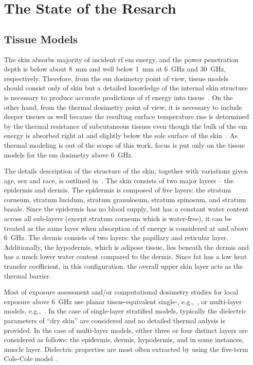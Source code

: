 \chapter{The State of the Resarch}
\label{chap:results}

\section{Tissue Models}
The skin absorbs majority of incident \gls{rf} \gls{em} energy, and the power penetration depth is below about \SI{8}{\mm} and well below \SI{1}{\mm} at \SI{6}{\GHz} and \SI{30}{\GHz}, respectively.
Therefore, from the \gls{em} dosimetry point of view, tissue models should consist only of skin but a detailed knowledge of the internal skin structure is necessary to produce accurate predictions of \gls{rf} energy into tissue~\cite{Ziskin2018Tissue}.
On the other hand, from the thermal dosimetry point of view, it is necessary to include deeper tissues as well because the resulting surface temperature rise is determined by the thermal resistance of subcutaneous tissues even though the bulk of the \gls{em} energy is absorbed right at and slightly below the sole surface of the skin~\cite{Ziskin2018Tissue}.
As thermal modeling is out of the scope of this work, focus is put only on the tissue models for the \gls{em} dosimetry above \SI{6}{\GHz}. 

The details description of the structure of the skin, together with variations given age, sex and race, is outlined in~\cite{Snyder1979Report}.
The skin consists of two major layers -- the epidermis and dermis.
The epidermis is composed of five layers: the stratum corneum, stratum lucidum, stratum granulosum, stratum spinosum, and stratum basale.
Since the epidermis has no blood supply, but has a constant water content across all sub-layers (except stratum corneum which is water-free), it can be treated as the same layer when absorption of \gls{rf} energy is considered at and above \SI{6}{\GHz}.
The dermis consists of two layers: the papillary and reticular layer.
Additionally, the hypodermis, which is adipose tissue, lies beneath the dermis and has a much lower water content compared to the dermis.
Since fat has a low heat transfer coefficient, in this configuration, the overall upper skin layer acts as the thermal barrier.

Most of exposure assessment and/or computational dosimetry studies for local exposure above \SI{6}{\GHz} use planar tissue-equivalent single-, e.g.,~\cite{Nakae2020Skin,Poljak2020Assessment,Ziane2020Antenna}, or multi-layer models, e.g.,~\cite{Wu2015Safe,Foster2018Modeling,He2018RF}.
In the case of single-layer stratified models, typically the dielectric parameters of ``dry skin'' are considered and no detailed thermal anlysis is provided.
In the case of multi-layer models, either three or four distinct layers are considered as follows: the epidermis, dermis, hypodermis, and in some instances, muscle layer.
Dielectric properties are most often extracted by using the five-term Cole-Cole model~\cite{Gabriel1996Compilation}.  

